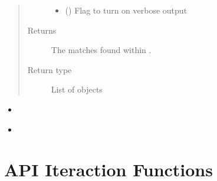 \documentclass[letterpaper,10pt,english]{sphinxmanual}
\begin{document}
\begin{fulllineitems}
\begin{quote}
\begin{description}
\begin{itemize}
\item {} 
 (\sphinxstyleliteralemphasis{\sphinxupquote{, }}\sphinxstyleliteralemphasis{\sphinxupquote{, }}) \textendash{} Flag to turn on verbose output

\end{itemize}

\item[{Returns}] \leavevmode
{} \textendash{} The matches found within .

\item[{Return type}] \leavevmode
List of {\hyperref[\detokenize{classes:pyresid.MatchClass}]{}} objects

\end{description}\end{quote}



\begin{itemize}
\item {} 
{\hyperref[\detokenize{functions:pyresid.identify_residues}]{}}

\item {} 
{\hyperref[\detokenize{functions:pyresid.load_protein_IDs}]{}}

\end{itemize}



\end{fulllineitems}



\chapter{API Iteraction Functions}
\label{\detokenize{functions:api-iteraction-functions}}
\end{document}
